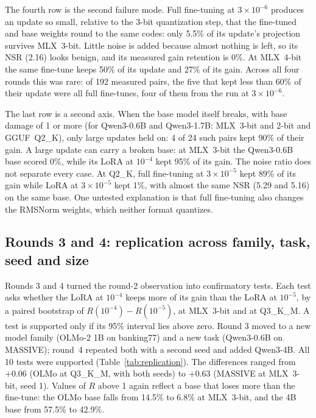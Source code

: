 \documentclass[11pt,letterpaper]{article}
\begin{document}
The fourth row is the second failure mode. Full fine-tuning at $3\times10^{-6}$ produces an update so small, relative to the 3-bit quantization step, that the fine-tuned and base weights round to the same codes: only 5.5\% of its update's projection survives MLX~3-bit. Little noise is added because almost nothing is left, so its NSR (2.16) looks benign, and its measured gain retention is 0\%. At MLX~4-bit the same fine-tune keeps 50\% of its update and 27\% of its gain. Across all four rounds this was rare: of 192 measured pairs, the five that kept less than 60\% of their update were all full fine-tunes, four of them from the run at $3\times10^{-6}$.

The last row is a second axis. When the base model itself breaks, with base damage of 1 or more (for Qwen3-0.6B and Qwen3-1.7B: MLX~3-bit and 2-bit and GGUF~Q2\_K), only large updates held on: 4 of 24 such pairs kept 90\% of their gain. A large update can carry a broken base: at MLX~3-bit the Qwen3-0.6B base scored 0\%, while its LoRA at $10^{-4}$ kept 95\% of its gain. The noise ratio does not separate every case. At Q2\_K, full fine-tuning at $3\times10^{-5}$ kept 89\% of its gain while LoRA at $3\times10^{-5}$ kept 1\%, with almost the same NSR (5.29 and 5.16) on the same base. One untested explanation is that full fine-tuning also changes the RMSNorm weights, which neither format quantizes.

\subsection{Rounds 3 and 4: replication across family, task, seed and size}
\label{sec:replication}

Rounds 3 and 4 turned the round-2 observation into confirmatory tests. Each test asks whether the LoRA at $10^{-4}$ keeps more of its gain than the LoRA at $10^{-5}$, by a paired bootstrap of $R(10^{-4}) - R(10^{-5})$, at MLX~3-bit and at Q3\_K\_M. A test is supported only if its 95\% interval lies above zero. Round 3 moved to a new model family (OLMo-2 1B on banking77) and a new task (Qwen3-0.6B on MASSIVE); round~4 repeated both with a second seed and added Qwen3-4B. All 10 tests were supported (Table~\ref{tab:replication}). The differences ranged from $+0.06$ (OLMo at Q3\_K\_M, with both seeds) to $+0.63$ (MASSIVE at MLX~3-bit, seed 1). Values of $R$ above 1 again reflect a base that loses more than the fine-tune: the OLMo base falls from 14.5\% to 6.8\% at MLX~3-bit, and the 4B base from 57.5\% to 42.9\%.
\end{document}
